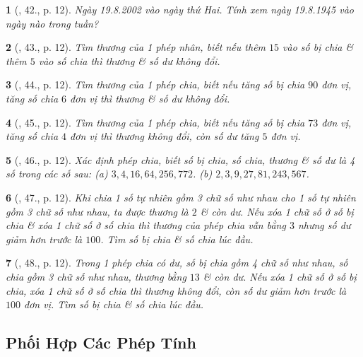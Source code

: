 \documentclass{article}
\newtheorem{baitoan}{}
\begin{document}
\begin{baitoan}[\cite{Binh_Toan_6_tap_1}, 42., p. 12]
	Ngày 19.8.2002 vào ngày thứ Hai. Tính xem ngày 19.8.1945 vào ngày nào trong tuần?
\end{baitoan}

\begin{baitoan}[\cite{Binh_Toan_6_tap_1}, 43., p. 12]
	Tìm thương của 1 phép nhân, biết nếu thêm $15$ vào số bị chia \& thêm $5$ vào số chia thì thương \& số dư không đổi.
\end{baitoan}

\begin{baitoan}[\cite{Binh_Toan_6_tap_1}, 44., p. 12]
	Tìm thương của 1 phép chia, biết nếu tăng số bị chia $90$ đơn vị, tăng số chia $6$ đơn vị thì thương \& số dư không đổi.
\end{baitoan}

\begin{baitoan}[\cite{Binh_Toan_6_tap_1}, 45., p. 12]
	Tìm thương của 1 phép chia, biết nếu tăng số bị chia $73$ đơn vị, tăng số chia $4$ đơn vị thì thương không đổi, còn số dư tăng $5$ đơn vị.
\end{baitoan}

\begin{baitoan}[\cite{Binh_Toan_6_tap_1}, 46., p. 12]
	Xác định phép chia, biết số bị chia, số chia, thương \& số dư là 4 số trong các số sau: (a) $3,4,16,64,256,772$. (b) $2,3,9,27,81,243,567$.
\end{baitoan}

\begin{baitoan}[\cite{Binh_Toan_6_tap_1}, 47., p. 12]
	Khi chia 1 số tự nhiên gồm 3 chữ số như nhau cho 1 số tự nhiên gồm 3 chữ số như nhau, ta được thương là $2$ \& còn dư. Nếu xóa 1 chữ số ở số bị chia \& xóa 1 chữ số ở số chia thì thương của phép chia vẫn bằng $3$ nhưng số dư giảm hơn trước là $100$. Tìm số bị chia \& số chia lúc đầu.
\end{baitoan}

\begin{baitoan}[\cite{Binh_Toan_6_tap_1}, 48., p. 12]
	Trong 1 phép chia có dư, số bị chia gồm 4 chữ số như nhau, số chia gồm 3 chữ số như nhau, thương bằng $13$ \& còn dư. Nếu xóa 1 chữ số ở số bị chia, xóa 1 chữ số ở số chia thì thương không đổi, còn số dư giảm hơn trước là $100$ đơn vị. Tìm số bị chia \& số chia lúc đầu.
\end{baitoan}

\subsection{Phối Hợp Các Phép Tính}
\end{document}
